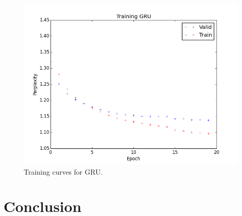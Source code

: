 \documentclass[11pt]{article}
\begin{document}
\begin{figure}[H]
\centering
\includegraphics[scale=0.5]{train_gru}
\caption{Training curves for GRU.}
\end{figure}

\section{Conclusion}



\end{document}

